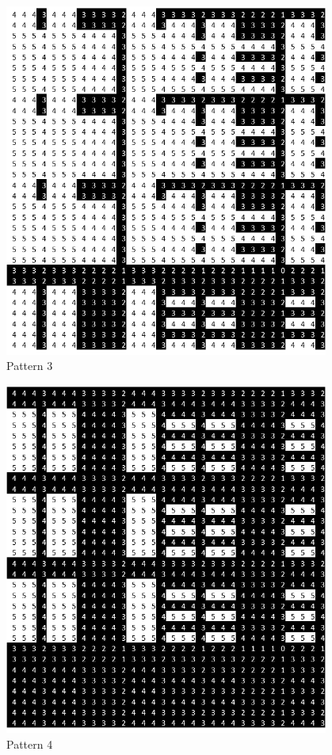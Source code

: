 \documentclass[oneside,12pt]{DISCSthesis}
\begin{document}
\begin{figure}[h]
			\begin{minipage}{.135\textwidth}\centering\includegraphics[width=0.95\textwidth]{img/3}\\ Pattern 3 \end{minipage}
			\begin{minipage}{.135\textwidth}\centering\includegraphics[width=0.95\textwidth]{img/4}\\ Pattern 4 \end{minipage}

\end{figure}
\end{document}
